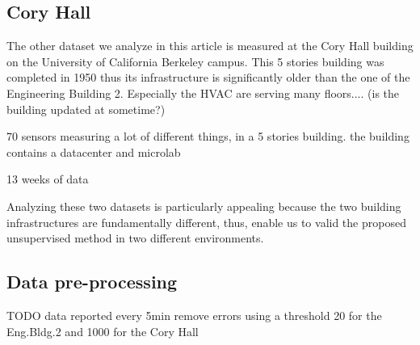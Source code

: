 \subsection{Cory Hall}
The other dataset we analyze in this article is measured at the Cory Hall building on the University of California Berkeley campus.
This 5 stories building was completed in 1950 thus its infrastructure is significantly older than the one of the Engineering Building 2.
Especially the HVAC are serving many floors.... (is the building updated at sometime?)

70 sensors measuring a lot of different things, in a 5 stories building. 
the building contains a datacenter and microlab 

13 weeks of data


Analyzing these two datasets is particularly appealing because the two building infrastructures are fundamentally different, thus, enable us to valid the proposed unsupervised method in two different environments.

\subsection{Data pre-processing}
TODO
data reported every 5min 
remove errors using a threshold 20 for the Eng.Bldg.2 and 1000 for the Cory Hall

